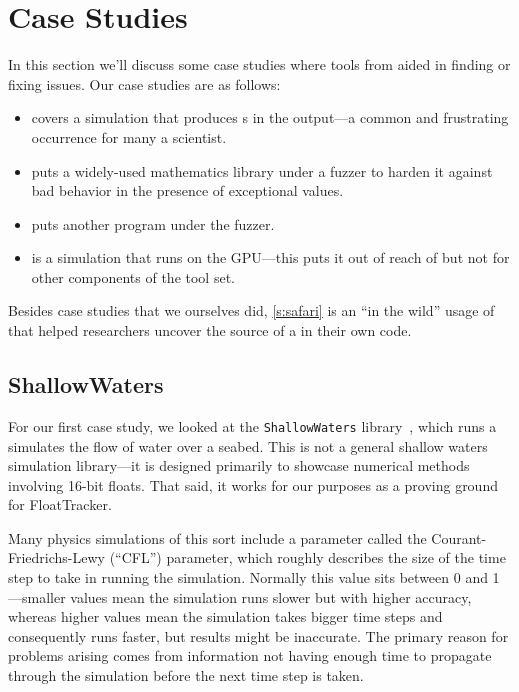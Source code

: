 \documentclass{juliacon}
\begin{document}
\section{Case Studies}
\label{s:casestudies}

In this section we'll discuss some case studies where tools from \FlowFPX{} aided in finding or fixing \fp{} issues.
Our case studies are as follows:

\begin{itemize}
\item {} covers a simulation that produces \NaN{}s in the output---a common and frustrating occurrence for many a scientist.
\item {} puts a widely-used mathematics library under a fuzzer to harden it against bad behavior in the presence of exceptional \fp{} values.
\item {} puts another program under the fuzzer.  %
\item {} is a simulation that runs on the GPU---this puts it out of reach of \FT{} but not for other components of the \FlowFPX{} tool set.
\end{itemize}

Besides case studies that we ourselves did, \cref{s:safari} is an ``in the wild'' usage of \FT{} that helped researchers uncover the source of a \NaN{} in their own code.

\subsection{ShallowWaters}
\label{s:sw}

For our first case study, we looked at the \texttt{ShallowWaters} library~\cite{klowerNumberFormatsError2020,klowerPositsAlternativeFloats2019,klowerLowprecisionClimateComputing2021}, which runs a simulates the flow of water over a seabed.
This is not a general shallow waters simulation library---it is designed primarily to showcase numerical methods involving 16-bit floats.
That said, it works for our purposes as a proving ground for FloatTracker.

Many physics simulations of this sort include a parameter called the Courant-Friedrichs-Lewy (``CFL'') parameter, which roughly describes the size of the time step to take in running the simulation.
Normally this value sits between 0 and 1---smaller values mean the simulation runs slower but with higher accuracy, whereas higher values mean the simulation takes bigger time steps and consequently runs faster, but results might be inaccurate.
The primary reason for problems arising comes from information not having enough time to propagate through the simulation before the next time step is taken.
\end{document}
